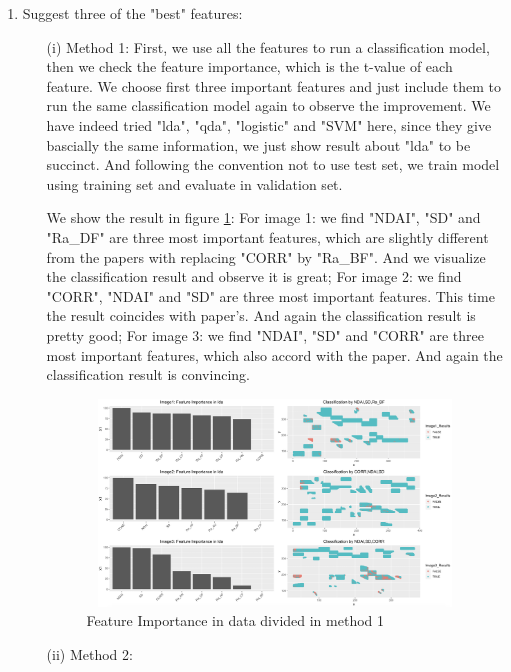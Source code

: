 \documentclass[11pt]{article}
\begin{document}
\begin{enumerate}[label=(\alph*)]
\item Suggest three of the "best" features:
\begin{enumerate}
\item[(i)] Method 1:
\quad First, we use all the features to run a classification model, then we check the feature importance, which is the t-value of each feature. We choose first three important features and just include them to run the same classification model again to observe the improvement. We have indeed tried "lda", "qda", "logistic" and "SVM" here, since they give bascially the same information, we just show result about "lda" to be succinct. And following the convention not to use test set, we train model using training set and evaluate in validation set. \par
\quad We show the result in figure \ref{FeatureSelect_Method1}: For image 1: we find "NDAI", "SD" and "Ra\_DF" are three most important features, which are slightly different from the papers with replacing "CORR" by "Ra\_BF". And we visualize the classification result and observe it is great; For image 2: we find "CORR", "NDAI" and "SD" are three most important features. This time the result coincides with paper's. And again the classification result is pretty good; For image 3: we find "NDAI", "SD" and "CORR" are three most important features, which also accord with the paper. And again the classification result is convincing.
\begin{figure}[h!]
	\centering
	\includegraphics[width = 11cm,height = 5.5cm]{Figure/FeatureSelect_Way1}
	\caption{Feature Importance in data divided in method 1}
	\label{FeatureSelect_Method1}
\end{figure}

\item[(ii)]  Method 2:


\end{enumerate}
\end{enumerate}
\end{document}
